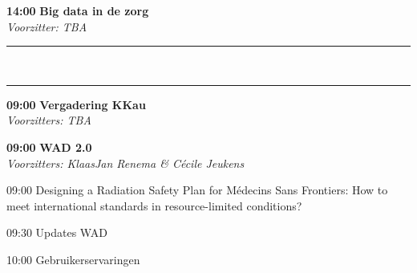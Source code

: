 \documentclass[a4paper,10pt]{report}
\begin{document}
\begin{multicols*}{3}

\begin{packed_enum}
\item[\textbf{14:00}] \textbf{Big data in de zorg}\\\textit{Voorzitter: TBA}
\end{packed_enum} %

\hrule\vspace{3mm}
\\
\hrule
\vfill

\begin{packed_enum}
\item[\textbf{09:00}] \textbf{Vergadering KKau}\\\textit{Voorzitters: TBA}
\end{packed_enum} %


\begin{packed_enum}
\item[\textbf{09:00}] \textbf{WAD 2.0}\\\textit{Voorzitters: KlaasJan Renema \& Cécile Jeukens}
\item[09:00] Designing a Radiation Safety Plan for Médecins Sans Frontiers: How to meet international standards in resource-limited conditions?
\item[09:30] Updates WAD
\item[10:00] Gebruikerservaringen
\end{packed_enum} %


\end{multicols*}
\end{document}
